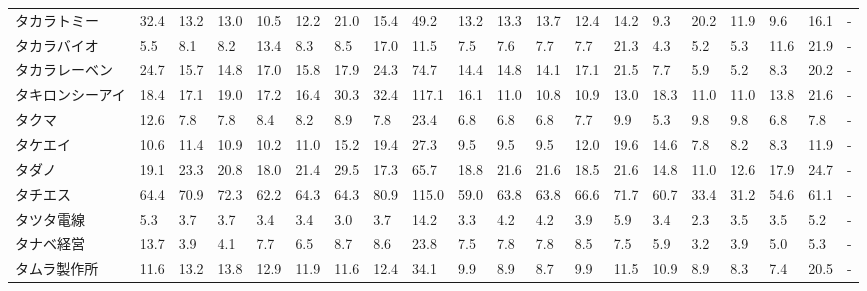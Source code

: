 \begin{tabular}{llllllllllllllllllll}
タカラトミー          &   32.4 &   13.2 &      13.0 &      10.5 &       12.2 &    21.0 &    15.4 &     49.2 &    13.2 &    13.3 &   13.7 &   12.4 &    14.2 &     9.3 &    20.2 &   11.9 &    9.6 &    16.1 &      - \\
タカラバイオ          &    5.5 &    8.1 &       8.2 &      13.4 &        8.3 &     8.5 &    17.0 &     11.5 &     7.5 &     7.6 &    7.7 &    7.7 &    21.3 &     4.3 &     5.2 &    5.3 &   11.6 &    21.9 &      - \\
タカラレーベン         &   24.7 &   15.7 &      14.8 &      17.0 &       15.8 &    17.9 &    24.3 &     74.7 &    14.4 &    14.8 &   14.1 &   17.1 &    21.5 &     7.7 &     5.9 &    5.2 &    8.3 &    20.2 &      - \\
タキロンシーアイ        &   18.4 &   17.1 &      19.0 &      17.2 &       16.4 &    30.3 &    32.4 &    117.1 &    16.1 &    11.0 &   10.8 &   10.9 &    13.0 &    18.3 &    11.0 &   11.0 &   13.8 &    21.6 &      - \\
タクマ             &   12.6 &    7.8 &       7.8 &       8.4 &        8.2 &     8.9 &     7.8 &     23.4 &     6.8 &     6.8 &    6.8 &    7.7 &     9.9 &     5.3 &     9.8 &    9.8 &    6.8 &     7.8 &      - \\
タケエイ            &   10.6 &   11.4 &      10.9 &      10.2 &       11.0 &    15.2 &    19.4 &     27.3 &     9.5 &     9.5 &    9.5 &   12.0 &    19.6 &    14.6 &     7.8 &    8.2 &    8.3 &    11.9 &      - \\
タダノ             &   19.1 &   23.3 &      20.8 &      18.0 &       21.4 &    29.5 &    17.3 &     65.7 &    18.8 &    21.6 &   21.6 &   18.5 &    21.6 &    14.8 &    11.0 &   12.6 &   17.9 &    24.7 &      - \\
タチエス            &   64.4 &   70.9 &      72.3 &      62.2 &       64.3 &    64.3 &    80.9 &    115.0 &    59.0 &    63.8 &   63.8 &   66.6 &    71.7 &    60.7 &    33.4 &   31.2 &   54.6 &    61.1 &      - \\
タツタ電線           &    5.3 &    3.7 &       3.7 &       3.4 &        3.4 &     3.0 &     3.7 &     14.2 &     3.3 &     4.2 &    4.2 &    3.9 &     5.9 &     3.4 &     2.3 &    3.5 &    3.5 &     5.2 &      - \\
タナベ経営           &   13.7 &    3.9 &       4.1 &       7.7 &        6.5 &     8.7 &     8.6 &     23.8 &     7.5 &     7.8 &    7.8 &    8.5 &     7.5 &     5.9 &     3.2 &    3.9 &    5.0 &     5.3 &      - \\
タムラ製作所          &   11.6 &   13.2 &      13.8 &      12.9 &       11.9 &    11.6 &    12.4 &     34.1 &     9.9 &     8.9 &    8.7 &    9.9 &    11.5 &    10.9 &     8.9 &    8.3 &    7.4 &    20.5 &      - \\

\end{tabular}

